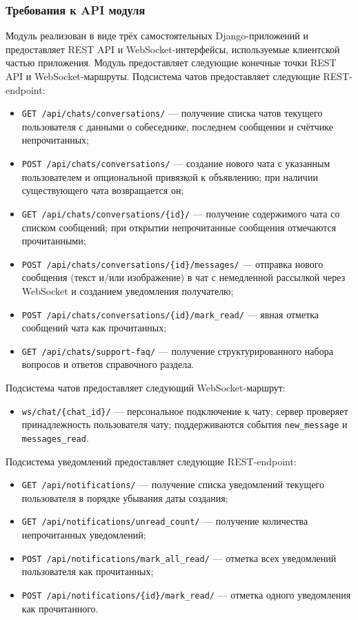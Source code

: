 \subsubsection{Требования к API модуля}
Модуль реализован в виде трёх самостоятельных Django-приложений и предоставляет REST API и WebSocket-интерфейсы, используемые клиентской частью приложения.
Модуль предоставляет следующие конечные точки REST API и WebSocket-маршруты.
Подсистема чатов предоставляет следующие REST-endpoint:
\begin{itemize}
    \item \texttt{GET /api/chats/conversations/} — получение списка чатов текущего пользователя с данными о собеседнике, последнем сообщении и счётчике непрочитанных;
    \item \texttt{POST /api/chats/conversations/} — создание нового чата с указанным пользователем и опциональной привязкой к объявлению; при наличии существующего чата возвращается он;
    \item \texttt{GET /api/chats/conversations/\{id\}/} — получение содержимого чата со списком сообщений; при открытии непрочитанные сообщения отмечаются прочитанными;
    \item \texttt{POST /api/chats/conversations/\{id\}/messages/} — отправка нового сообщения (текст и/или изображение) в чат с немедленной рассылкой через WebSocket и созданием уведомления получателю;
    \item \texttt{POST /api/chats/conversations/\{id\}/mark\_read/} — явная отметка сообщений чата как прочитанных;
    \item \texttt{GET /api/chats/support-faq/} — получение структурированного набора вопросов и ответов справочного раздела.
\end{itemize}

Подсистема чатов предоставляет следующий WebSocket-маршрут:
\begin{itemize}
    \item \texttt{ws/chat/\{chat\_id\}/} — персональное подключение к чату; сервер проверяет принадлежность пользователя чату; поддерживаются события \texttt{new\_message} и \texttt{messages\_read}.
\end{itemize}

Подсистема уведомлений предоставляет следующие REST-endpoint:
\begin{itemize}
    \item \texttt{GET /api/notifications/} — получение списка уведомлений текущего пользователя в порядке убывания даты создания;
    \item \texttt{GET /api/notifications/unread\_count/} — получение количества непрочитанных уведомлений;
    \item \texttt{POST /api/notifications/mark\_all\_read/} — отметка всех уведомлений пользователя как прочитанных;
    \item \texttt{POST /api/notifications/\{id\}/mark\_read/} — отметка одного уведомления как прочитанного.
\end{itemize}

